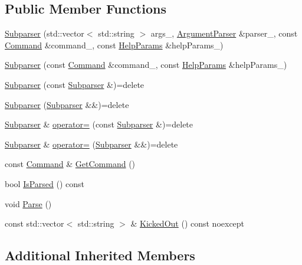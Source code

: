 \subsection*{Public Member Functions}
\begin{DoxyCompactItemize}
\item 
\hyperlink{classargs_1_1_subparser_a64ec29a58edf8dc13191d564d44c0e56}{Subparser} (std\+::vector$<$ std\+::string $>$ args\+\_\+, \hyperlink{classargs_1_1_argument_parser}{Argument\+Parser} \&parser\+\_\+, const \hyperlink{classargs_1_1_command}{Command} \&command\+\_\+, const \hyperlink{structargs_1_1_help_params}{Help\+Params} \&help\+Params\+\_\+)
\item 
\hyperlink{classargs_1_1_subparser_ac67a2024b78cf51d9e3726fda9b019a9}{Subparser} (const \hyperlink{classargs_1_1_command}{Command} \&command\+\_\+, const \hyperlink{structargs_1_1_help_params}{Help\+Params} \&help\+Params\+\_\+)
\item 
\hyperlink{classargs_1_1_subparser_a1de3a334a3e7608253481c5d2016c9e9}{Subparser} (const \hyperlink{classargs_1_1_subparser}{Subparser} \&)=delete
\item 
\hyperlink{classargs_1_1_subparser_aeca66a5a106fb30035f0aa8044b60b05}{Subparser} (\hyperlink{classargs_1_1_subparser}{Subparser} \&\&)=delete
\item 
\hyperlink{classargs_1_1_subparser}{Subparser} \& \hyperlink{classargs_1_1_subparser_a8eb8bfab0fefbc937d6549bf5e63ea8f}{operator=} (const \hyperlink{classargs_1_1_subparser}{Subparser} \&)=delete
\item 
\hyperlink{classargs_1_1_subparser}{Subparser} \& \hyperlink{classargs_1_1_subparser_ac4821d34029cac237edd11ec6c1d0e0f}{operator=} (\hyperlink{classargs_1_1_subparser}{Subparser} \&\&)=delete
\item 
const \hyperlink{classargs_1_1_command}{Command} \& \hyperlink{classargs_1_1_subparser_aa905d5a0c53b105a938f620cf5635b5c}{Get\+Command} ()
\item 
bool \hyperlink{classargs_1_1_subparser_ae4c7180aca9908df174e657cafe86ce8}{Is\+Parsed} () const
\item 
void \hyperlink{classargs_1_1_subparser_a9a21d184d749d4b5d8b6bddd4c5fda33}{Parse} ()
\item 
const std\+::vector$<$ std\+::string $>$ \& \hyperlink{classargs_1_1_subparser_add2992dcceeb0f2554f8d099a38e1358}{Kicked\+Out} () const noexcept
\end{DoxyCompactItemize}
\subsection*{Additional Inherited Members}


